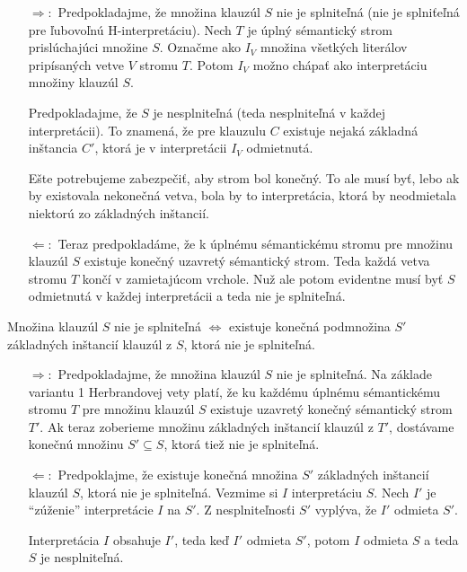 \begin{dokaz}
    \noindent
    \begin{itemize}
    \item[$\Rightarrow:$] Predpokladajme, že množina klauzúl $S$
        nie je splniteľná (nie je splniťeľná pre ľubovoľnú
        H-interpretáciu).
        Nech $T$ je úplný sémantický strom prislúchajúci množine $S$.
        Označme ako $I_V$ množina všetkých literálov
        pripísaných vetve $V$ stromu $T$.
        Potom $I_V$ možno chápať ako interpretáciu množiny klauzúl $S$.

        Predpokladajme, že $S$ je nesplniteľná
        (teda nesplniteľná v každej interpretácii).
        To znamená, že pre klauzulu $C$ existuje nejaká
        základná inštancia $C'$, ktorá je v interpretácii $I_V$ odmietnutá.

        Ešte potrebujeme zabezpečiť, aby strom bol konečný.
        To ale musí byť, lebo ak by existovala nekonečná vetva,
        bola by to interpretácia, ktorá by neodmietala niektorú zo 
        základných inštancií.

    \item[$\Leftarrow:$] Teraz predpokladáme,
        že k úplnému sémantickému stromu pre množinu klauzúl $S$
        existuje konečný uzavretý sémantický strom.
        Teda každá vetva stromu $T$ končí v zamietajúcom vrchole.
        Nuž ale potom evidentne musí byť $S$ odmietnutá v každej
        interpretácii a teda nie je splniteľná.
    \end{itemize}
\end{dokaz}

\begin{veta}[Herbrandova 2]
    Množina klauzúl $S$ nie je splniteľná $\iff$
    existuje konečná podmnožina $S'$ základných inštancií klauzúl z $S$,
    ktorá nie je splniteľná.
\end{veta}

\begin{dokaz}
    \noindent
    \begin{itemize}
    \item[$\Rightarrow:$] Predpokladajme, že množina klauzúl $S$
        nie je splniteľná. Na základe variantu 1 Herbrandovej vety
        platí, že ku každému úplnému sémantickému stromu $T$ pre
        množinu klauzúl $S$ existuje uzavretý konečný sémantický
        strom $T'$. Ak teraz zoberieme množinu základných inštancií
        klauzúl z $T'$, dostávame konečnú množinu $S' \subseteq S$,
        ktorá tiež nie je splniteľná.

    \item[$\Leftarrow:$] Predpoklajme, že existuje
        konečná množina $S'$ základných inštancií klauzúl $S$,
        ktorá nie je splniteľná.
        Vezmime si $I$ interpretáciu $S$.
        Nech $I'$ je ``zúženie'' interpretácie $I$ na $S'$.
        Z nesplniteľnosťi $S'$ vyplýva, že $I'$ odmieta $S'$.

        Interpretácia $I$ obsahuje $I'$, teda keď $I'$ odmieta $S'$,
        potom $I$ odmieta $S$ a teda $S$ je nesplniteľná.
    \end{itemize}
\end{dokaz}

